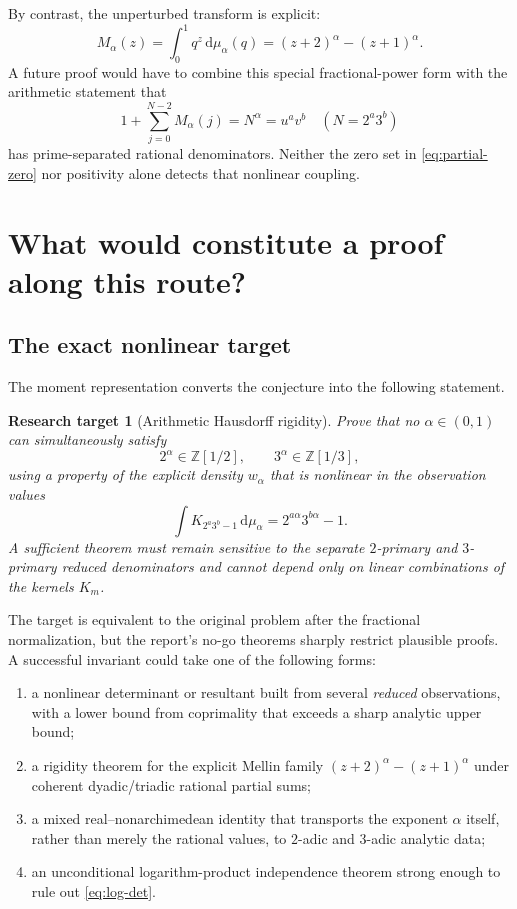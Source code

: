 \documentclass[11pt,oneside]{article}
\newtheorem{target}[theorem]{Research target}
\theoremstyle{definition}
\theoremstyle{remark}
\newcommand{\Z}{\mathbb Z}
\newcommand{\dd}{\,\mathrm d}
\begin{document}
By contrast, the unperturbed transform is explicit:
\[
 M_\alpha(z)=\int_0^1q^z\dd\mu_\alpha(q)
 =(z+2)^\alpha-(z+1)^\alpha.
\]
A future proof would have to combine this special fractional-power form with the arithmetic
statement that
\[
 1+\sum_{j=0}^{N-2}M_\alpha(j)=N^\alpha=u^av^b
 \quad(N=2^a3^b)
\]
has prime-separated rational denominators.  Neither the zero set in
\eqref{eq:partial-zero} nor positivity alone detects that nonlinear coupling.

\section{What would constitute a proof along this route?}

\subsection{The exact nonlinear target}

The moment representation converts the conjecture into the following statement.

\begin{target}[Arithmetic Hausdorff rigidity]\label{target:arithmetic-hausdorff}
Prove that no $\alpha\in(0,1)$ can simultaneously satisfy
\begin{equation}\label{eq:target-coordinates}
 2^\alpha\in\Z[1/2],
 \qquad
 3^\alpha\in\Z[1/3],
\end{equation}
using a property of the explicit density $w_\alpha$ that is nonlinear in the observation
values
\[
 \int K_{2^a3^b-1}\dd\mu_\alpha=2^{a\alpha}3^{b\alpha}-1.
\]
A sufficient theorem must remain sensitive to the separate $2$-primary and $3$-primary
reduced denominators and cannot depend only on linear combinations of the kernels $K_m$.
\end{target}

The target is equivalent to the original problem after the fractional normalization, but the
report's no-go theorems sharply restrict plausible proofs.  A successful invariant could take
one of the following forms:

\begin{enumerate}
\item a nonlinear determinant or resultant built from several \emph{reduced} observations,
      with a lower bound from coprimality that exceeds a sharp analytic upper bound;
\item a rigidity theorem for the explicit Mellin family
      $(z+2)^\alpha-(z+1)^\alpha$ under coherent dyadic/triadic rational partial sums;
\item a mixed real--nonarchimedean identity that transports the exponent $\alpha$ itself,
      rather than merely the rational values, to $2$-adic and $3$-adic analytic data;
\item an unconditional logarithm-product independence theorem strong enough to rule out
      \eqref{eq:log-det}.
\end{enumerate}
\end{document}

